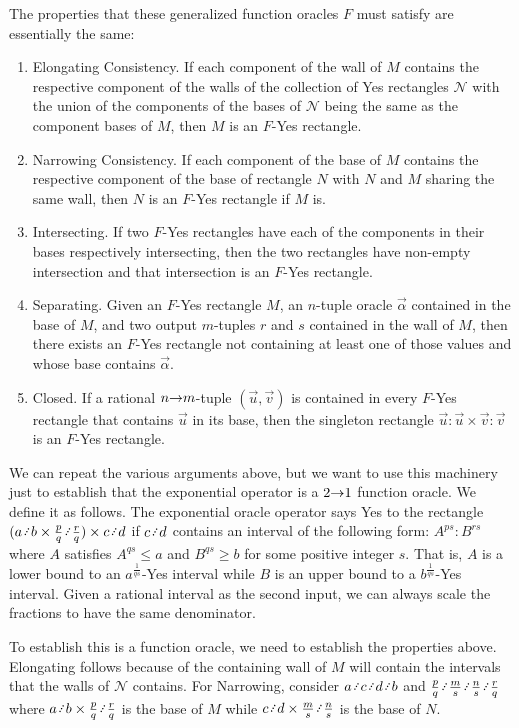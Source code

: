\documentclass[12pt]{article}
\begin{document}
The properties that these generalized function oracles $F$ must satisfy are essentially the same: 
\begin{enumerate}
    \item Elongating Consistency. If each component of the wall of $M$ contains the respective component of the walls of  the collection of Yes rectangles $\mathcal{N}$ with the union of the components of the bases of $\mathcal{N}$ being the same as the component bases of $M$, then $M$ is an $F$-Yes rectangle. 
    \item Narrowing Consistency. If each component of the base of  $M$ contains the respective component of the base of rectangle $N$ with $N$ and $M$ sharing the same wall, then $N$ is an $F$-Yes rectangle if $M$ is. 
    \item Intersecting. If two $F$-Yes rectangles have each of the components in their bases respectively intersecting, then the two rectangles have non-empty intersection and that intersection is an $F$-Yes rectangle. 
    \item Separating. Given an $F$-Yes rectangle $M$, an $n$-tuple oracle $\vec{\alpha}$ contained in the base of $M$, and two output $m$-tuples $r$ and $s$ contained in the wall of $M$, then there exists an $F$-Yes rectangle not containing at least one of those values and whose base contains $\vec{\alpha}$.
    \item Closed. If a rational $n\mathord{\rightarrow} m$-tuple $(\vec{u},\vec{v})$ is contained in every $F$-Yes rectangle that contains $\vec{u}$ in its base, then the singleton rectangle $\vec{u}:\vec{u} \times \vec{v}:\vec{v}$ is an $F$-Yes rectangle. 
\end{enumerate} 

We can repeat the various arguments above, but we want to use this machinery just to establish that the exponential operator is a $2\mathord{\rightarrow} 1$ function oracle. We define it as follows. The exponential oracle operator says Yes to the rectangle $(a\lte b \times \frac{p}{q} \lte \frac{r}{q}) \times c \lte d$ if $c\lte d$ contains an interval of the following form:  $A^{ps} : B^{rs}$ where $A$ satisfies $A^{qs} \leq a$ and $B^{qs} \geq b$ for some positive integer $s$. That is, $A$ is a lower bound to an $a^{\frac{1}{qs}}$-Yes interval while $B$ is an upper bound to a $b^{\frac{1}{qs}}$-Yes interval. Given a rational interval as the second input, we can always scale the fractions to have the same denominator. 

To establish this is a function oracle, we need to establish the properties above. Elongating follows because of the containing wall of $M$ will contain the intervals that the walls of $\mathcal{N}$ contains. For Narrowing, consider $a \lte c \lte d \lte b$ and $\frac{p}{q} \lte \frac{m}{s} \lte \frac{n}{s} \lte \frac{r}{q}$ where $a\lte b \times \frac{p}{q} \lte \frac{r}{q}$ is the base of $M$ while $c \lte d \times \frac{m}{s} \lte \frac{n}{s}$ is the base of $N$.
\end{document}
